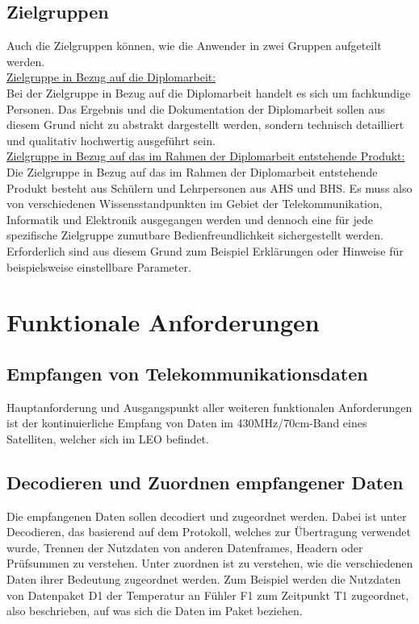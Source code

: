 \subsection{Zielgruppen}
Auch die Zielgruppen können, wie die Anwender in zwei Gruppen aufgeteilt werden.\\

\underline{Zielgruppe in Bezug auf die Diplomarbeit: }\\
Bei der Zielgruppe in Bezug auf die Diplomarbeit handelt es sich um fachkundige Personen. Das 
Ergebnis und die Dokumentation der Diplomarbeit sollen aus diesem Grund nicht zu abstrakt 
dargestellt werden, sondern technisch detailliert und qualitativ hochwertig ausgeführt sein.\\

\underline{Zielgruppe in Bezug auf das im Rahmen der Diplomarbeit entstehende Produkt: }\\
Die Zielgruppe in Bezug auf das im Rahmen der Diplomarbeit entstehende Produkt besteht aus 
Schülern und Lehrpersonen aus AHS und BHS. Es muss also von verschiedenen Wissensstandpunkten 
im Gebiet der Telekommunikation, Informatik und Elektronik ausgegangen werden und dennoch eine 
für jede spezifische Zielgruppe zumutbare Bedienfreundlichkeit sichergestellt werden. Erforderlich 
sind aus diesem Grund zum Beispiel Erklärungen oder Hinweise für beispielsweise einstellbare 
Parameter. 

\section{Funktionale Anforderungen}
\subsection{Empfangen von Telekommunikationsdaten}
Hauptanforderung und Ausgangspunkt aller weiteren funktionalen Anforderungen ist der 
kontinuierliche Empfang von Daten im 430MHz/70cm-Band eines Satelliten, welcher sich im LEO 
befindet.\\

\subsection{Decodieren und Zuordnen empfangener Daten}
Die empfangenen Daten sollen decodiert und zugeordnet werden. Dabei ist unter Decodieren, das 
basierend auf dem Protokoll, welches zur Übertragung verwendet wurde, Trennen der Nutzdaten von 
anderen Datenframes, Headern oder Prüfsummen zu verstehen. Unter zuordnen ist zu verstehen, wie 
die verschiedenen Daten ihrer Bedeutung zugeordnet werden. Zum Beispiel werden die Nutzdaten von 
Datenpaket D1 der Temperatur an Fühler F1 zum Zeitpunkt T1 zugeordnet, also beschrieben, auf was 
sich die Daten im Paket beziehen.\\

